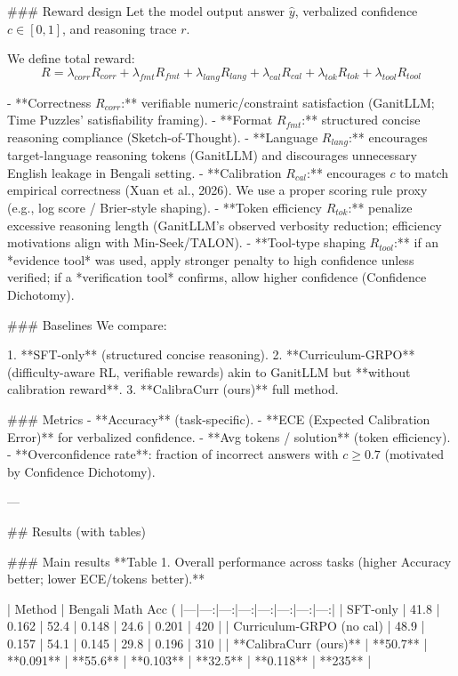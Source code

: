 ### Reward design  
Let the model output answer \(\hat{y}\), verbalized confidence \(c \in [0,1]\), and reasoning trace \(r\).

We define total reward:
\[
R = \lambda_{corr} R_{corr} + \lambda_{fmt} R_{fmt} + \lambda_{lang} R_{lang} + \lambda_{cal} R_{cal} + \lambda_{tok} R_{tok} + \lambda_{tool} R_{tool}
\]

- **Correctness \(R_{corr}\):** verifiable numeric/constraint satisfaction (GanitLLM; Time Puzzles’ satisfiability framing).  
- **Format \(R_{fmt}\):** structured concise reasoning compliance (Sketch-of-Thought).  
- **Language \(R_{lang}\):** encourages target-language reasoning tokens (GanitLLM) and discourages unnecessary English leakage in Bengali setting.  
- **Calibration \(R_{cal}\):** encourages \(c\) to match empirical correctness (Xuan et al., 2026). We use a proper scoring rule proxy (e.g., log score / Brier-style shaping).  
- **Token efficiency \(R_{tok}\):** penalize excessive reasoning length (GanitLLM’s observed verbosity reduction; efficiency motivations align with Min-Seek/TALON).  
- **Tool-type shaping \(R_{tool}\):** if an *evidence tool* was used, apply stronger penalty to high confidence unless verified; if a *verification tool* confirms, allow higher confidence (Confidence Dichotomy).

### Baselines  
We compare:

1. **SFT-only** (structured concise reasoning).  
2. **Curriculum-GRPO** (difficulty-aware RL, verifiable rewards) akin to GanitLLM but **without calibration reward**.  
3. **CalibraCurr (ours)** full method.

### Metrics  
- **Accuracy** (task-specific).  
- **ECE (Expected Calibration Error)** for verbalized confidence.  
- **Avg tokens / solution** (token efficiency).  
- **Overconfidence rate**: fraction of incorrect answers with \(c \ge 0.7\) (motivated by Confidence Dichotomy).  

---

## Results (with tables)  

### Main results  
**Table 1. Overall performance across tasks (higher Accuracy better; lower ECE/tokens better).**

| Method | Bengali Math Acc (%
|---|---:|---:|---:|---:|---:|---:|---:|
| SFT-only | 41.8 | 0.162 | 52.4 | 0.148 | 24.6 | 0.201 | 420 |
| Curriculum-GRPO (no cal) | 48.9 | 0.157 | 54.1 | 0.145 | 29.8 | 0.196 | 310 |
| **CalibraCurr (ours)** | **50.7** | **0.091** | **55.6** | **0.103** | **32.5** | **0.118** | **235** |

